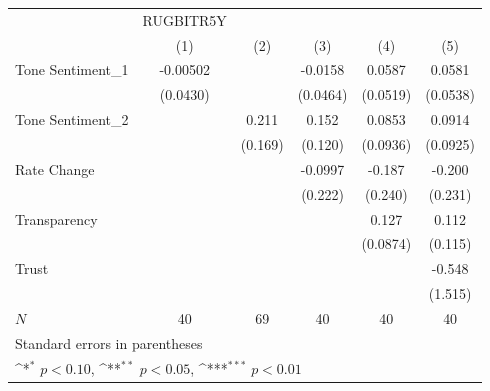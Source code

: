 {
\def\sym#1{\ifmmode^{#1}\else\(^{#1}\)\fi}
\begin{tabular}{l*{5}{c}}
\hline\hline
            &   RUGBITR5Y         &                     &                     &                     &                     \\
            &\multicolumn{1}{c}{(1)}         &\multicolumn{1}{c}{(2)}         &\multicolumn{1}{c}{(3)}         &\multicolumn{1}{c}{(4)}         &\multicolumn{1}{c}{(5)}         \\
\hline
Tone Sentiment\_{1}&    -0.00502         &                     &     -0.0158         &      0.0587         &      0.0581         \\
            &    (0.0430)         &                     &    (0.0464)         &    (0.0519)         &    (0.0538)         \\
[1em]
Tone Sentiment\_{2}&                     &       0.211         &       0.152         &      0.0853         &      0.0914         \\
            &                     &     (0.169)         &     (0.120)         &    (0.0936)         &    (0.0925)         \\
[1em]
Rate Change &                     &                     &     -0.0997         &      -0.187         &      -0.200         \\
            &                     &                     &     (0.222)         &     (0.240)         &     (0.231)         \\
[1em]
Transparency&                     &                     &                     &       0.127         &       0.112         \\
            &                     &                     &                     &    (0.0874)         &     (0.115)         \\
[1em]
Trust       &                     &                     &                     &                     &      -0.548         \\
            &                     &                     &                     &                     &     (1.515)         \\
\hline
\(N\)       &          40         &          69         &          40         &          40         &          40         \\
\hline\hline
\multicolumn{6}{l}{\footnotesize Standard errors in parentheses}\\
\multicolumn{6}{l}{\footnotesize \sym{*} \(p<0.10\), \sym{**} \(p<0.05\), \sym{***} \(p<0.01\)}\\
\end{tabular}
}
